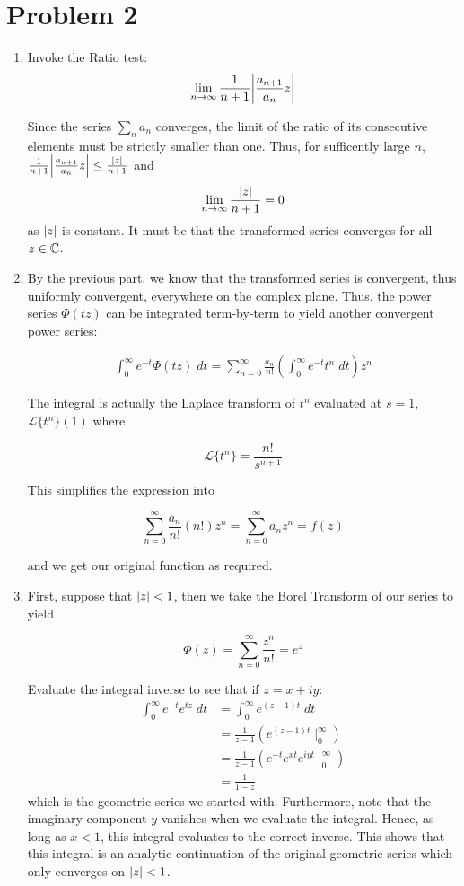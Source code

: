 \documentclass[12pt]{article}%
\newcommand{\infsum}[1][0]{\sum^{\infty}_{n = {#1}}}
\begin{document}
\section{Problem 2}
\begin{enumerate}
  \item Invoke the Ratio test:
  \[\lim_{n \rightarrow \infty} \frac{1}{n+1}\abs{\frac{a_{n+1}}{a_n}z} \]

  Since the series $\sum_n a_n$ converges, the limit of the ratio of its consecutive elements must be strictly smaller than one. Thus, for sufficently large $n$, $\frac{1}{n+1}\abs{\frac{a_{n+1}}{a_n}z} \leq \frac{\abs{z}}{n+1}$ and $$\lim_{n \rightarrow \infty} \frac{\abs{z}}{n+1} = 0$$ as $\abs{z}$ is constant. It must be that the transformed series converges for all $z \in {\mathbb{C}}$.

  \item
  By the previous part, we know that the transformed series is convergent, thus uniformly convergent, everywhere on the complex plane. Thus, the power series $\Phi(tz)$ can be integrated term-by-term to yield another convergent power series:

  \begin{align*}
    \int_0^\infty e^{-t} \Phi(tz) \; dt = \infsum \frac{a_n}{n!} \left( \int_0^\infty e^{-t} t^n \; dt\right) z^n
  \end{align*}

  The integral is actually the Laplace transform of $t^n$ evaluated at $s = 1$, $\mathcal{L}\{t^n\}(1)$ where

  \[\mathcal{L}\{t^n\} = \frac{n!}{s^{n+1}}\]

  This simplifies the expression into

  \[\infsum \frac{a_n}{n!} \left( n!\right) z^n  = \infsum a_n z^n = f(z) \]

  and we get our original function as required.

  \item
  First, suppose that $\abs{z} < 1$, then we take the Borel Transform of our series to yield

  \[ \Phi(z) = \infsum \frac{z^n}{n!} = e^z \]

  Evaluate the integral inverse to see that if $z = x + iy$:
\begin{align*}
  \int_0^\infty e^{-t}e^{tz} \; dt & = \int_0^\infty e^{(z-1)t} \; dt \\
  & = \frac{1}{z -1} \left(e^{(z-1)t} \mid_0^\infty\right) \\
  & = \frac{1}{z-1}\left(e^{-t}e^{xt}e^{iyt}\mid_0^\infty\right) \\
  & = \frac{1}{1 - z}
\end{align*}
which is the geometric series we started with. Furthermore, note that the imaginary component $y$ vanishes when we evaluate the integral. Hence, as long as $x < 1$, this integral evaluates to the correct inverse. This shows that this integral is an analytic continuation of the original geometric series which only converges on $\abs{z} < 1$.


\end{enumerate}
\end{document}
